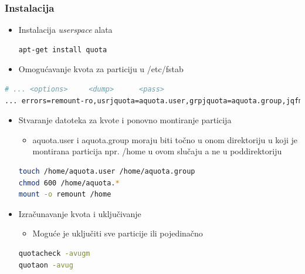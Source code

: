 \documentclass[croatian,t]{beamer} %
\begin{document}
	\begin{frame}[fragile]
	\frametitle{Instalacija}
		\begin{itemize}
			\item Instalacija \textit{userspace} alata
			\begin{lstlisting}[basicstyle={\tiny\ttfamily},language=bash]
apt-get install quota
			\end{lstlisting}
			\item Omogućavanje kvota za particiju u /etc/fstab
		\end{itemize}
		\begin{lstlisting}[basicstyle={\tiny\ttfamily},language=bash]
# ... <options> 	<dump> 		<pass>
... errors=remount-ro,usrjquota=aquota.user,grpjquota=aquota.group,jqfmt=vfsv0 0 1
		\end{lstlisting}
		\begin{itemize}
			\item Stvaranje datoteka za kvote i ponovno montiranje particija
			\begin{itemize}
				\item aquota.user i aquota.group moraju biti točno u onom direktoriju u koji je montirana particija npr. /home u ovom slučaju a ne u poddirektoriju
			\end{itemize}
			\begin{lstlisting}[basicstyle={\tiny\ttfamily},language=bash]
touch /home/aquota.user /home/aquota.group
chmod 600 /home/aquota.*
mount -o remount /home
			\end{lstlisting}
			\item Izračunavanje kvota i uključivanje
			\begin{itemize}
				\item Moguće je uključiti sve particije ili pojedinačno
			\end{itemize}
			\begin{lstlisting}[basicstyle={\tiny\ttfamily},language=bash]
quotacheck -avugm
quotaon -avug
			\end{lstlisting}
		\end{itemize}
	\end{frame}
	
\end{document}
